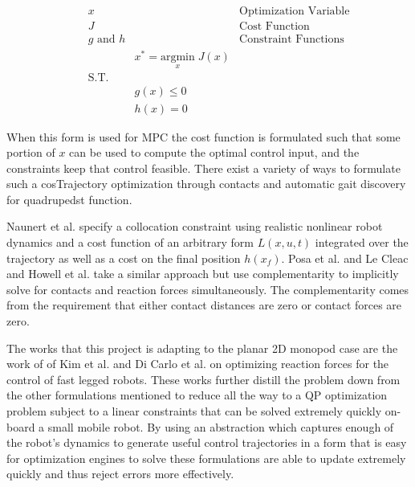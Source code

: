 \documentclass[conference]{IEEEtran}
\begin{document}
\begin{align*}
    \quad & x                &                                           & \text{Optimization Variable} \\
          & J                &                                           & \text{Cost Function}         \\
          & g \text{ and } h &                                           & \text{Constraint Functions}  \\
          &                  & x^* = \underset{x}{\text{argmin}} \; J(x)                                \\
          & \text{S.T.}      &                                                                          \\
          &                  & g(x) \leq 0                                                              \\
          &                  & h(x) = 0
\end{align*}

When this form is used for MPC the cost function is formulated such that some portion of \(x\) can be used to compute the optimal control input, and the constraints keep that control feasible.
There exist a variety of ways to formulate such a cosTrajectory optimization through contacts and automatic gait discovery for quadrupedst function.

Naunert et al. \cite{neunert_whole-body_2018} specify a collocation constraint using realistic nonlinear robot dynamics and a cost function of an arbitrary form \(L(x, u, t)\) integrated over the trajectory as well as a cost on the final position \(h(x_f)\).
Posa et al. \cite{posa_direct_2014} and Le Cleac and Howell et al. \cite{cleach_fast_2023} take a similar approach but use complementarity to implicitly solve for contacts and reaction forces simultaneously.
The complementarity comes from the requirement that either contact distances are zero or contact forces are zero.

The works that this project is adapting to the planar 2D monopod case are the work of of Kim et al. \cite{kim_highly_2019} and Di Carlo et al. \cite{di_carlo_dynamic_2018} on optimizing reaction forces for the control of fast legged robots.
These works further distill the problem down from the other formulations mentioned to reduce all the way to a QP optimization problem subject to a linear constraints that can be solved extremely quickly on-board a small mobile robot.
By using an abstraction which captures enough of the robot's dynamics to generate useful control trajectories in a form that is easy for optimization engines to solve these formulations are able to update extremely quickly and thus reject errors more effectively.
\end{document}
